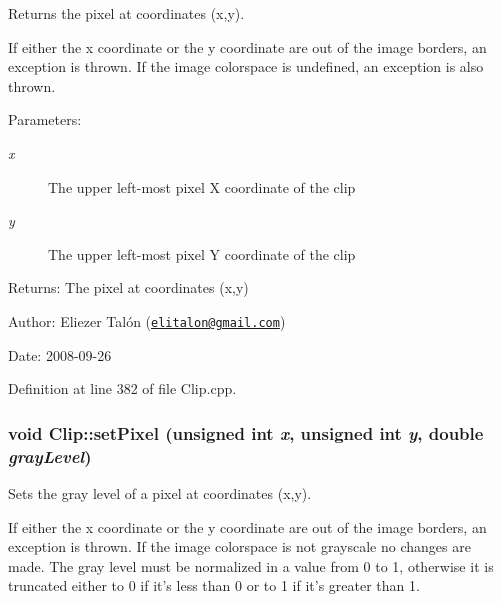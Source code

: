 Returns the pixel at coordinates (x,y). 

If either the x coordinate or the y coordinate are out of the image borders, an exception is thrown. If the image colorspace is undefined, an exception is also thrown.

\begin{Desc}
\item[Parameters:]
\begin{description}
\item[{\em x}]The upper left-most pixel X coordinate of the clip \item[{\em y}]The upper left-most pixel Y coordinate of the clip\end{description}
\end{Desc}
\begin{Desc}
\item[Returns:]The pixel at coordinates (x,y)\end{Desc}
\begin{Desc}
\item[Author:]Eliezer Talón (\href{mailto:elitalon@gmail.com}{\tt elitalon@gmail.com}) \end{Desc}
\begin{Desc}
\item[Date:]2008-09-26 \end{Desc}


Definition at line 382 of file Clip.cpp.\hypertarget{class_clip_3c48493242de7453438ed0e8d0ea74df}{
\subsubsection[setPixel]{\setlength{\rightskip}{0pt plus 5cm}void Clip::setPixel (unsigned int {\em x}, \/  unsigned int {\em y}, \/  double {\em grayLevel})}}
\label{class_clip_3c48493242de7453438ed0e8d0ea74df}


Sets the gray level of a pixel at coordinates (x,y). 

If either the x coordinate or the y coordinate are out of the image borders, an exception is thrown. If the image colorspace is not grayscale no changes are made. The gray level must be normalized in a value from 0 to 1, otherwise it is truncated either to 0 if it's less than 0 or to 1 if it's greater than 1.

